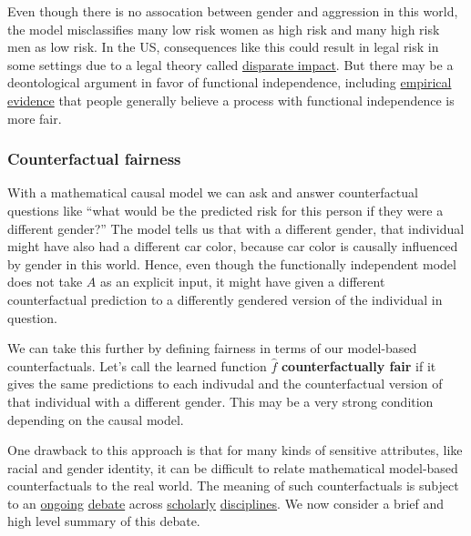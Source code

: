 \documentclass[]{book}
\theoremstyle{definition}
\theoremstyle{definition}
\theoremstyle{definition}
\theoremstyle{remark}
\begin{document}
Even though there is no assocation between gender and aggression in this
world, the model misclassifies many low risk women as high risk and many
high risk men as low risk. In the US, consequences like this could
result in legal risk in some settings due to a legal theory called
\href{https://en.wikipedia.org/wiki/Disparate_impact}{disparate impact}.
But there may be a deontological argument in favor of functional
independence, including
\href{http://www.mlandthelaw.org/papers/grgic.pdf}{empirical evidence}
that people generally believe a process with functional independence is
more fair.

\subsubsection{Counterfactual fairness}\label{counterfactual-fairness}

With a mathematical causal model we can ask and answer counterfactual
questions like ``what would be the predicted risk for this person if
they were a different gender?'' The model tells us that with a different
gender, that individual might have also had a different car color,
because car color is causally influenced by gender in this world. Hence,
even though the functionally independent model does not take \(A\) as an
explicit input, it might have given a different counterfactual
prediction to a differently gendered version of the individual in
question.

We can take this further by defining fairness in terms of our
model-based counterfactuals. Let's call the learned function \(\hat f\)
\textbf{counterfactually fair} if it gives the same predictions to each
indivudal and the counterfactual version of that individual with a
different gender. This may be a very strong condition depending on the
causal model.

One drawback to this approach is that for many kinds of sensitive
attributes, like racial and gender identity, it can be difficult to
relate mathematical model-based counterfactuals to the real world. The
meaning of such counterfactuals is subject to an
\href{https://www.ncbi.nlm.nih.gov/pmc/articles/PMC4125322/}{ongoing}
\href{https://scholar.harvard.edu/files/msen/files/race_causality.pdf}{debate}
across
\href{http://www.ets.org/Media/Research/pdf/RR-03-03-Holland.pdf}{scholarly}
\href{https://papers.ssrn.com/sol3/papers.cfm?abstract_id=3050650}{disciplines}.
We now consider a brief and high level summary of this debate.
\end{document}
